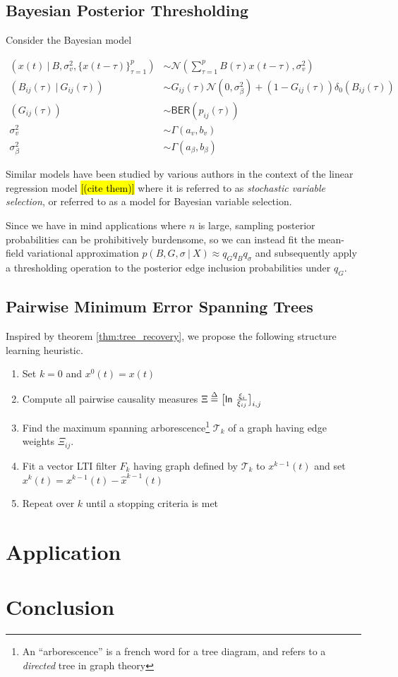 \documentclass[12pt]{article}
\begin{document}
\subsection{Bayesian Posterior Thresholding}
Consider the Bayesian model

\begin{equation}
  \begin{aligned}
    (x(t)\ |\ B, \sigma_v^2, \{x(t - \tau)\}_{\tau = 1}^p) &\sim \mathcal{N}(\sum_{\tau = 1}^pB(\tau)x(t - \tau), \sigma_v^2)\\
    (B_{ij}(\tau)\ |\ G_{ij}(\tau)) &\sim G_{ij}(\tau)\mathcal{N}(0, \sigma_\beta^2) + (1 - G_{ij}(\tau))\delta_0(B_{ij}(\tau))\\
    (G_{ij}(\tau)) &\sim \mathsf{BER}(p_{ij}(\tau))\\
    \sigma_v^2 &\sim \Gamma(a_v, b_v)\\
    \sigma_\beta^2 &\sim \Gamma(a_\beta, b_\beta)
  \end{aligned}
\end{equation}

Similar models have been studied by various authors in the context of the linear regression model \hl{[(cite them)]} where it is referred to as \textit{stochastic variable selection}, or referred to as a model for Bayesian variable selection.

Since we have in mind applications where $n$ is large, sampling posterior probabilities can be prohibitively burdensome, so we can instead fit the mean-field variational approximation $p(B, G, \sigma\ |\ X) \approx q_Gq_Bq_\sigma$ and subsequently apply a thresholding operation to the posterior edge inclusion probabilities under $q_G$.

\subsection{Pairwise Minimum Error Spanning Trees}
Inspired by theorem \ref{thm:tree_recovery}, we propose the following
structure learning heuristic.


\begin{enumerate}
  \item{Set $k = 0$ and $x^0(t) = x(t)$}
  \item{Compute all pairwise causality measures $\Xi \overset{\Delta}{=} \big[\mathsf{ln\ } \frac{\xi_i}{\xi_{ij}} \big]_{i, j}$}
  \item{Find the maximum spanning arborescence\footnote{An ``arborescence'' is a french word for a tree diagram, and refers to a \textit{directed} tree in graph theory} $\mathcal{T}_k$ of a graph having edge weights $\Xi_{ij}$.}
  \item{Fit a vector LTI filter $F_k$ having graph defined by $\mathcal{T}_k$ to $x^{k - 1}(t)$ and set $x^k(t) = x^{k - 1}(t) - \hat{x}^{k - 1}(t)$}
  \item{Repeat over $k$ until a stopping criteria is met}
\end{enumerate}


\section{Application}
\section{Conclusion}

\printbibliography
\end{document}
